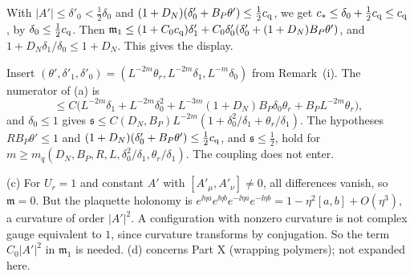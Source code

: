 \begin{detail}\label{d8:ix16}
\begin{step}[(a)]
With $|A'|\le\delta'_0<\frac12\delta_0$ and $(1+D_N)(\delta'_0+B_P\theta')\le\frac12c_{\rm q}$, we get $c_*\le\delta_0+\frac12c_{\rm q}\le c_{\rm q}$, by $\delta_0\le\frac12c_{\rm q}$. Then $\mathfrak m_1\le(1+C_0c_{\rm q})\delta'_1+C_0\delta'_0(\delta'_0+(1+D_N)B_P\theta')$, and $1+D_N\delta_1/\delta_0\le1+D_N$. This gives the display.
\end{step}
\begin{step}
Insert $(\theta',\delta'_1,\delta'_0)=(L^{-2m}\theta_r,L^{-2m}\delta_1,L^{-m}\delta_0)$ from Remark~(i). The numerator of (a) is
\[
\le C\big(L^{-2m}\delta_1+L^{-2m}\delta_0^2+L^{-3m}(1+D_N)B_P\delta_0\theta_r+B_PL^{-2m}\theta_r\big),
\]
and $\delta_0\le1$ gives $\mathfrak s\le C(D_N,B_P)L^{-2m}(1+\delta_0^2/\delta_1+\theta_r/\delta_1)$. The hypotheses $RB_P\theta'\le1$ and $(1+D_N)(\delta'_0+B_P\theta')\le\frac12c_{\rm q}$, and $\mathfrak s\le\frac12$, hold for $m\ge m_q(D_N,B_P,R,L,\delta_0^2/\delta_1,\theta_r/\delta_1)$. The coupling does not enter.
\end{step}
\begin{step}[(c), (d)]
(c) For $U_r=1$ and constant $A'$ with $[A'_\mu,A'_\nu]\ne0$, all differences vanish, so $\mathfrak m=0$. But the plaquette holonomy is $e^{\ii\eta a}e^{\ii\eta b}e^{-\ii\eta a}e^{-\ii\eta b}=1-\eta^2[a,b]+O(\eta^3)$, a curvature of order $|A'|^2$. A configuration with nonzero curvature is not complex gauge equivalent to $1$, since curvature transforms by conjugation. So the term $C_0|A'|^2$ in $\mathfrak m_1$ is needed. (d) concerns Part X (wrapping polymers); not expanded here.
\end{step}
\end{detail}

